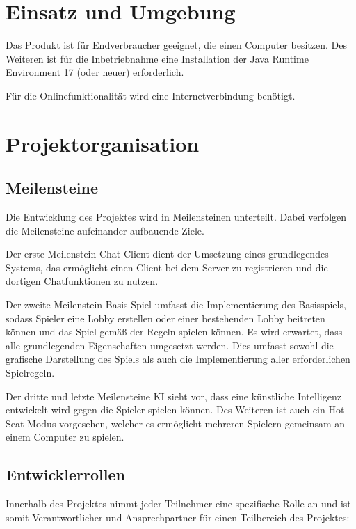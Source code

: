 \documentclass[a4paper]{scrreprt}
\begin{document}
\section{Einsatz und Umgebung}

Das Produkt ist für Endverbraucher geeignet, die einen Computer besitzen. Des Weiteren ist für die Inbetriebnahme eine Installation der \glqq Java Runtime Environment 17\grqq{} (oder neuer) erforderlich.

Für die Onlinefunktionalität wird eine Internetverbindung benötigt.

\section{Projektorganisation}
\subsection{Meilensteine}

Die Entwicklung des Projektes wird in Meilensteinen unterteilt. Dabei verfolgen die Meilensteine aufeinander aufbauende Ziele.

Der erste Meilenstein \glqq Chat Client\grqq{} dient der Umsetzung eines grundlegendes Systems, das ermöglicht einen Client bei dem Server zu registrieren und die dortigen Chatfunktionen zu nutzen.

Der zweite Meilenstein \glqq Basis Spiel\grqq{} umfasst die Implementierung des Basisspiels, sodass Spieler eine Lobby erstellen oder einer bestehenden Lobby beitreten
können und das Spiel gemäß der Regeln spielen können. Es wird erwartet, dass alle grundlegenden Eigenschaften umgesetzt werden. Dies umfasst sowohl die grafische Darstellung des Spiels als auch die Implementierung aller erforderlichen Spielregeln.

Der dritte und letzte Meilensteine \glqq KI\grqq{} sieht vor, dass eine künstliche Intelligenz entwickelt wird gegen die Spieler spielen können. Des Weiteren ist auch ein \glqq Hot-Seat\grqq{}-Modus vorgesehen, welcher es ermöglicht mehreren Spielern gemeinsam an einem Computer zu spielen.

\subsection{Entwicklerrollen}

Innerhalb des Projektes nimmt jeder Teilnehmer eine spezifische Rolle an und ist somit Verantwortlicher und Ansprechpartner für einen Teilbereich des Projektes:
\end{document}
